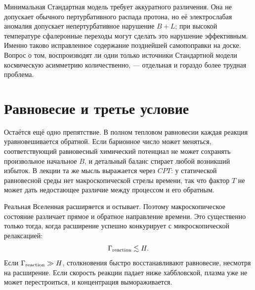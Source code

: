 Минимальная Стандартная модель требует аккуратного различения. Она не допускает обычного пертурбативного распада протона, но её электрослабая аномалия допускает непертурбативное нарушение \(B+L\); при высокой температуре сфалеронные переходы могут сделать это нарушение эффективным. Именно таково исправленное содержание позднейшей самопоправки на доске. Вопрос о том, воспроизводят ли одни только источники Стандартной модели космическую асимметрию количественно, — отдельная и гораздо более трудная проблема.

\section{Равновесие и третье условие}

Остаётся ещё одно препятствие. В полном тепловом равновесии каждая реакция уравновешивается обратной. Если барионное число может меняться, соответствующий равновесный химический потенциал не может сохранять произвольное начальное \(B\), и детальный баланс стирает любой возникший избыток. В лекции та же мысль выражается через \(CPT\): у статической равновесной среды нет макроскопической стрелы времени, так что фактор \(T\) не может дать недостающее различие между процессом и его обратным.

Реальная Вселенная расширяется и остывает. Поэтому макроскопическое состояние различает прямое и обратное направление времени. Это существенно только тогда, когда расширение успешно конкурирует с микроскопической релаксацией:
\begin{equation}
\Gamma_{\rm reaction}\lesssim H.
\label{eq:c08-freezeout-condition}
\end{equation}
Если \(\Gamma_{\rm reaction}\gg H\), столкновения быстро восстанавливают равновесие, несмотря на расширение. Если скорость реакции падает ниже хаббловской, плазма уже не может перестроиться, и концентрация вымораживается.

\begin{classroomqa}
\end{classroomqa}

